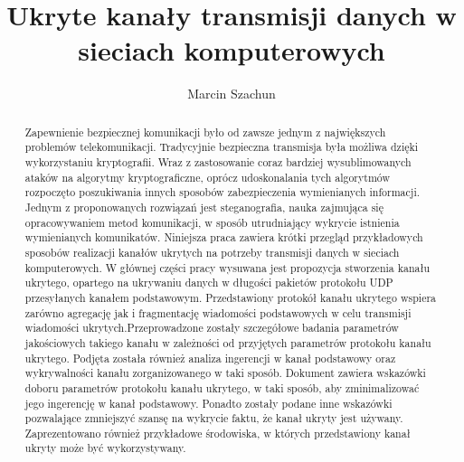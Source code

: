\documentclass[a4paper, twoside]{report}
\begin{document}
\title{Ukryte kanały transmisji danych w sieciach komputerowych}
\author{Marcin Szachun}
\maketitle


\begin{abstract}
    Zapewnienie bezpiecznej komunikacji było od zawsze jednym z największych
    problemów telekomunikacji. Tradycyjnie bezpieczna transmisja była możliwa
    dzięki wykorzystaniu kryptografii. Wraz z zastosowanie coraz bardziej wysublimowanych
    ataków na algorytmy kryptograficzne, oprócz udoskonalania tych algorytmów rozpoczęto
    poszukiwania innych sposobów zabezpieczenia wymienianych informacji. Jednym
    z proponowanych rozwiązań jest steganografia, nauka zajmująca się opracowywaniem
    metod komunikacji, w sposób utrudniający wykrycie istnienia wymienianych komunikatów.
    Niniejsza praca zawiera krótki przegląd przykładowych sposobów
    realizacji kanałów ukrytych na potrzeby transmisji danych w sieciach komputerowych.
    W głównej części pracy wysuwana jest propozycja stworzenia kanału ukrytego, opartego na ukrywaniu
    danych w długości pakietów protokołu UDP przesyłanych kanałem podstawowym.
    Przedstawiony protokół kanału ukrytego wspiera zarówno agregację jak i fragmentację
    wiadomości podstawowych w celu transmisji wiadomości ukrytych.Przeprowadzone
    zostały szczegółowe badania parametrów jakościowych takiego kanału w zależności
    od przyjętych parametrów protokołu kanału ukrytego. Podjęta została również
    analiza ingerencji w kanał podstawowy oraz wykrywalności kanału zorganizowanego w taki sposób.
    Dokument zawiera wskazówki doboru parametrów protokołu kanału ukrytego, w taki sposób, aby
    zminimalizować jego ingerencję w kanał podstawowy. Ponadto zostały podane inne
    wskazówki pozwalające zmniejszyć szansę na wykrycie faktu, że kanał ukryty jest
    używany. Zaprezentowano również przykładowe środowiska, w których przedstawiony
    kanał ukryty może być wykorzystywany.
\end{abstract}

\tableofcontents
\end{document}
